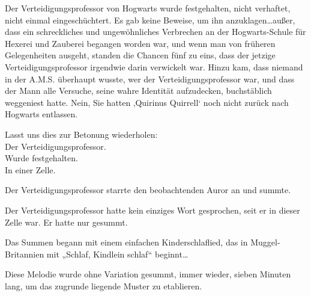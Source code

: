 Der Verteidigungsprofessor von Hogwarts wurde festgehalten, nicht verhaftet, nicht einmal eingeschüchtert. Es gab keine Beweise, um ihn anzuklagen…außer, dass ein schreckliches und ungewöhnliches Verbrechen an der Hogwarts-Schule für Hexerei und Zauberei begangen worden war, und wenn man von früheren Gelegenheiten ausgeht, standen die Chancen fünf zu eins, dass der jetzige Verteidigungsprofessor irgendwie darin verwickelt war. Hinzu kam, dass niemand in der A.M.S. überhaupt wusste, wer der Verteidigungsprofessor war, und dass der Mann alle Versuche, seine wahre Identität aufzudecken, buchstäblich weggeniest hatte.
Nein, Sie hatten ‚Quirinus Quirrell‘ noch nicht zurück nach Hogwarts entlassen.




Lasst uns dies zur Betonung wiederholen:\\
Der Verteidigungsprofessor.\\
Wurde festgehalten.\\
In einer Zelle.

Der Verteidigungsprofessor starrte den beobachtenden Auror an und summte.

Der Verteidigungsprofessor hatte kein einziges Wort gesprochen, seit er in dieser Zelle war. Er hatte nur gesummt.

Das Summen begann mit einem einfachen Kinderschlaflied, das in Muggel-Britannien mit „Schlaf, Kindlein schlaf“ beginnt…

Diese Melodie wurde ohne Variation gesummt, immer wieder, sieben Minuten lang, um das zugrunde liegende Muster zu etablieren.

